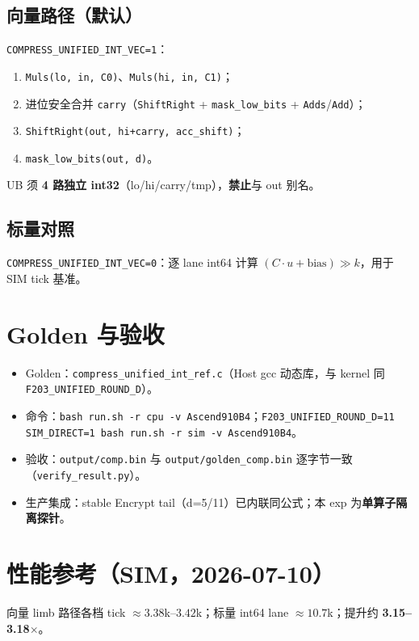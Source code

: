 \documentclass[UTF8,a4paper,11pt]{ctexart}
\begin{document}
\subsection{向量路径（默认）}
\texttt{COMPRESS\_UNIFIED\_INT\_VEC=1}：
\begin{enumerate}
  \item \texttt{Muls(lo, in, C0)}、\texttt{Muls(hi, in, C1)}；
  \item 进位安全合并 \texttt{carry}（\texttt{ShiftRight} + \texttt{mask\_low\_bits} + \texttt{Adds}/\texttt{Add}）；
  \item \texttt{ShiftRight(out, hi+carry, acc\_shift)}；
  \item \texttt{mask\_low\_bits(out, d)}。
\end{enumerate}
UB 须 \textbf{4 路独立 int32}（lo/hi/carry/tmp），\textbf{禁止}与 out 别名。

\subsection{标量对照}
\texttt{COMPRESS\_UNIFIED\_INT\_VEC=0}：逐 lane int64 计算 $(C\cdot u+\text{bias})\gg k$，用于 SIM tick 基准。

\section{Golden 与验收}

\begin{itemize}
  \item Golden：\texttt{compress\_unified\_int\_ref.c}（Host gcc 动态库，与 kernel 同 \texttt{F203\_UNIFIED\_ROUND\_D}）。
  \item 命令：\texttt{bash run.sh -r cpu -v Ascend910B4}；\texttt{F203\_UNIFIED\_ROUND\_D=11 SIM\_DIRECT=1 bash run.sh -r sim -v Ascend910B4}。
  \item 验收：\texttt{output/comp.bin} 与 \texttt{output/golden\_comp.bin} 逐字节一致（\texttt{verify\_result.py}）。
  \item 生产集成：stable Encrypt tail（d=5/11）已内联同公式；本 exp 为\textbf{单算子隔离探针}。
\end{itemize}

\section{性能参考（SIM，2026-07-10）}

向量 limb 路径各档 tick $\approx 3.38$k--$3.42$k；标量 int64 lane $\approx 10.7$k；提升约 \textbf{3.15--3.18$\times$}。
\end{document}
